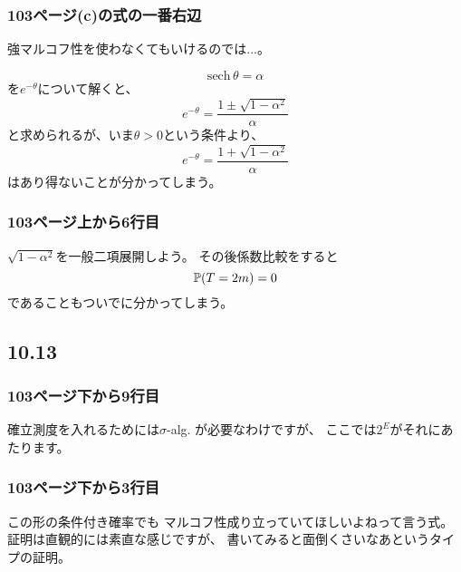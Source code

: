       \subsubsection{103ページ(c)の式の一番右辺}
        強マルコフ性を使わなくてもいけるのでは...。

        \[
          \text{sech}\, \theta = \alpha
        \]
        を$e^{-\theta}$について解くと、
        \[
          e^{-\theta} = \frac{1 \pm \sqrt{1 - \alpha^2}}{\alpha}
        \]
        と求められるが、いま$\theta > 0$という条件より、
        \[
          e^{-\theta} = \frac{1 + \sqrt{1 - \alpha^2}}{\alpha}
        \]
        はあり得ないことが分かってしまう。

      \subsubsection{103ページ上から6行目}
        $\sqrt{1 - \alpha^2}$を一般二項展開しよう。
        その後係数比較をすると
        \[
          {\mathbb{P}}(T = 2m) = 0
        \]
        であることもついでに分かってしまう。

    \subsection{10.13}
      \subsubsection{103ページ下から9行目}
        確立測度を入れるためには$\sigma$-alg. が必要なわけですが、
        ここでは$2^E$がそれにあたります。

      \subsubsection{103ページ下から3行目}
        この形の条件付き確率でも
        マルコフ性成り立っていてほしいよねって言う式。
        証明は直観的には素直な感じですが、
        書いてみると面倒くさいなあというタイプの証明。

